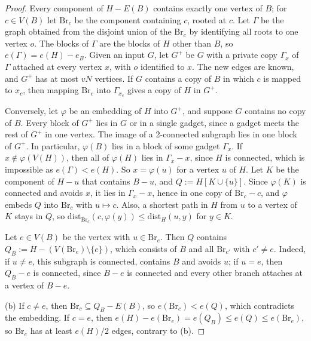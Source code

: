 \documentclass[11pt]{article}
\theoremstyle{remark}
\begin{document}
\begin{proof}
Every component of $H-E(B)$ contains exactly one vertex of $B$; for $c\in V(B)$ let $\mathrm{Br}_c$ be the component containing $c$, rooted at $c$. Let $\Gamma$ be the graph obtained from the disjoint union of the $\mathrm{Br}_c$ by identifying all roots to one vertex $o$. The blocks of $\Gamma$ are the blocks of $H$ other than $B$, so $e(\Gamma)=e(H)-e_B$. Given an input $G$, let $G^+$ be $G$ with a private copy $\Gamma_x$ of $\Gamma$ attached at every vertex $x$, with $o$ identified to $x$. The new edges are known, and $G^+$ has at most $vN$ vertices. If $G$ contains a copy of $B$ in which $c$ is mapped to $x_c$, then mapping $\mathrm{Br}_c$ into $\Gamma_{x_c}$ gives a copy of $H$ in $G^+$.

Conversely, let $\varphi$ be an embedding of $H$ into $G^+$, and suppose $G$ contains no copy of $B$. Every block of $G^+$ lies in $G$ or in a single gadget, since a gadget meets the rest of $G^+$ in one vertex. The image of a 2-connected subgraph lies in one block of $G^+$. In particular, $\varphi(B)$ lies in a block of some gadget $\Gamma_x$. If $x\notin\varphi(V(H))$, then all of $\varphi(H)$ lies in $\Gamma_x-x$, since $H$ is connected, which is impossible as $e(\Gamma)<e(H)$. So $x=\varphi(u)$ for a vertex $u$ of $H$. Let $K$ be the component of $H-u$ that contains $B-u$, and $Q:=H[K\cup\{u\}]$. Since $\varphi(K)$ is connected and avoids $x$, it lies in $\Gamma_x-x$, hence in one copy of $\mathrm{Br}_c-c$, and $\varphi$ embeds $Q$ into $\mathrm{Br}_c$ with $u\mapsto c$. Also, a shortest path in $H$ from $u$ to a vertex of $K$ stays in $Q$, so $\mathrm{dist}_{\mathrm{Br}_c}(c,\varphi(y))\le\mathrm{dist}_H(u,y)$ for $y\in K$.

Let $e\in V(B)$ be the vertex with $u\in\mathrm{Br}_e$. Then $Q$ contains $Q_B:=H-(V(\mathrm{Br}_e)\setminus\{e\})$, which consists of $B$ and all $\mathrm{Br}_{c'}$ with $c'\ne e$. Indeed, if $u\ne e$, this subgraph is connected, contains $B$ and avoids $u$; if $u=e$, then $Q_B-e$ is connected, since $B-e$ is connected and every other branch attaches at a vertex of $B-e$.

(b) If $c\ne e$, then $\mathrm{Br}_c\subseteq Q_B-E(B)$, so $e(\mathrm{Br}_c)<e(Q)$, which contradicts the embedding. If $c=e$, then $e(H)-e(\mathrm{Br}_e)=e(Q_B)\le e(Q)\le e(\mathrm{Br}_e)$, so $\mathrm{Br}_e$ has at least $e(H)/2$ edges, contrary to (b).


\end{proof}
\end{document}
